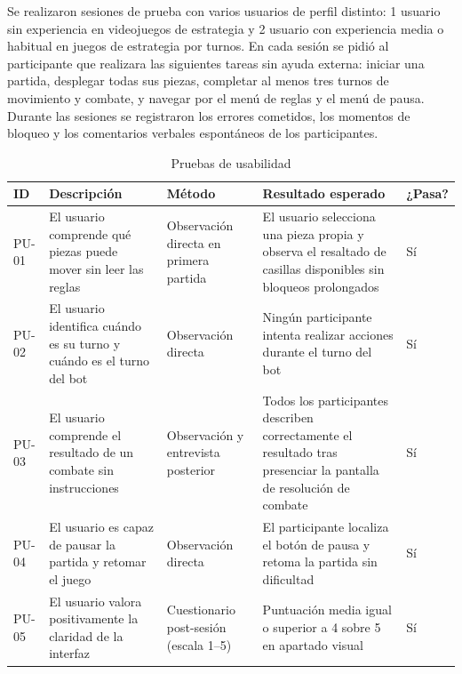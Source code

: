 Se realizaron sesiones de prueba con varios usuarios de perfil distinto: 1 usuario sin experiencia en videojuegos de estrategia y 2 usuario con experiencia media o habitual en juegos de estrategia por turnos. En cada sesión se pidió al participante que realizara las siguientes tareas sin ayuda externa: iniciar una partida, desplegar todas sus piezas, completar al menos tres turnos de movimiento y combate, y navegar por el menú de reglas y el menú de pausa. Durante las sesiones se registraron los errores cometidos, los momentos de bloqueo y los comentarios verbales espontáneos de los participantes.

\begin{table}[H]
	\centering
	\small
	\begin{tabular}{|>{\centering\arraybackslash}p{1cm}|>{\centering\arraybackslash}p{4cm}|>{\centering\arraybackslash}p{3cm}|>{\centering\arraybackslash}p{5cm}|>{\centering\arraybackslash}p{1.5cm}|}
		\hline
		\textbf{ID} & \textbf{Descripción} & \textbf{Método} &
		\textbf{Resultado esperado} & \textbf{¿Pasa?} \\
		\hline
		PU-01 & El usuario comprende qué piezas puede mover sin leer las reglas &
		Observación directa en primera partida &
		El usuario selecciona una pieza propia y observa el resaltado de casillas
		disponibles sin bloqueos prolongados & \cellcolor{green!40}Sí \\
		\hline
		PU-02 & El usuario identifica cuándo es su turno y cuándo es el turno del bot &
		Observación directa &
		Ningún participante intenta realizar acciones durante el turno del bot & \cellcolor{green!40}Sí \\
		\hline
		PU-03 & El usuario comprende el resultado de un combate sin instrucciones &
		Observación y entrevista posterior &
		Todos los participantes describen correctamente el resultado tras presenciar
		la pantalla de resolución de combate & \cellcolor{green!40}Sí \\
		\hline
		PU-04 & El usuario es capaz de pausar la partida y retomar el juego &
		Observación directa &
		El participante localiza el botón de pausa y retoma la partida sin
		dificultad & \cellcolor{green!40}Sí \\
		\hline
		PU-05 & El usuario valora positivamente la claridad de la interfaz &
		Cuestionario post-sesión (escala 1--5) &
		Puntuación media igual o superior a 4 sobre 5 en apartado visual &
		\cellcolor{green!40}Sí \\
		\hline
	\end{tabular}
	\caption{Pruebas de usabilidad}
\end{table}

